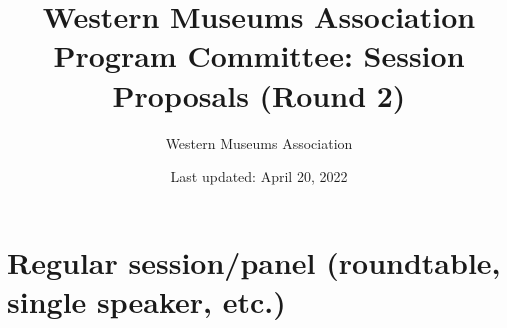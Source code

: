 \documentclass{report}
\title{ Western Museums Association Program Committee: Session Proposals (Round 2)}
\date{ Last updated: April 20, 2022}
\author{Western Museums Association}
\begin{document}
  \maketitle
  \newpage
  \tableofcontents
  \newpage
  
    \newpage
    \chapter*{ Regular session/panel (roundtable, single speaker, etc.) }

      
        
        
        
        
        
        
        
        
        
        
        
        
        
        
        
        
        
        
        
        
        
        
        
        
        
        
        
        
        
        
        
        
        
        
        
        
        
        
        
        
        
        
        
        
        
        
        
        
        
        
        
        
        
        
        
        
        
        
        
        
        
        
        
        
        
        
        
        
        
\end{document}
